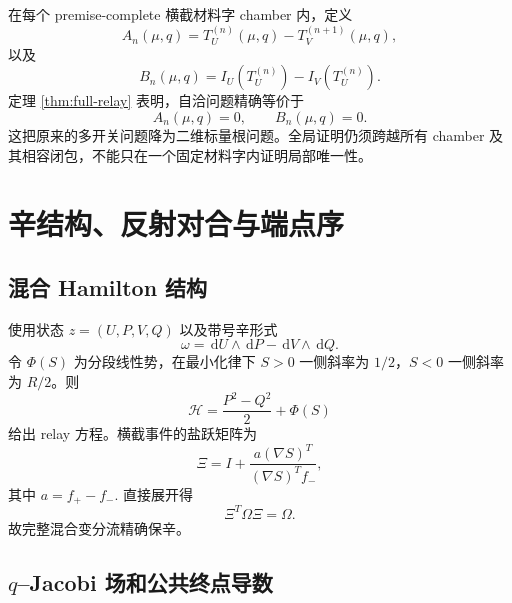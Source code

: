 \documentclass[UTF8,12pt,openany,fontset=fandol]{ctexrep}
\theoremstyle{definition}
\newcommand{\dd}{\,\mathrm d}
\begin{document}
在每个 premise-complete 横截材料字 chamber 内，定义
\begin{equation}
 A_n(\mu,q)=T_U^{(n)}(\mu,q)-T_V^{(n+1)}(\mu,q),
\end{equation}
以及
\begin{equation}
 B_n(\mu,q)=I_U(T_U^{(n)})-I_V(T_U^{(n)}).
\end{equation}
定理 \ref{thm:full-relay} 表明，自洽问题精确等价于
\begin{equation}
 A_n(\mu,q)=0,\qquad B_n(\mu,q)=0.
\end{equation}
这把原来的多开关问题降为二维标量根问题。全局证明仍须跨越所有 chamber 及其相容闭包，不能只在一个固定材料字内证明局部唯一性。

\chapter{辛结构、反射对合与端点序}

\section{混合 Hamilton 结构}

使用状态 $z=(U,P,V,Q)$ 以及带号辛形式
\begin{equation}
 \omega=\dd U\wedge\dd P-\dd V\wedge\dd Q.
\end{equation}
令 $\Phi(S)$ 为分段线性势，在最小化律下 $S>0$ 一侧斜率为 $1/2$，$S<0$ 一侧斜率为 $R/2$。则
\begin{equation}
 \mathcal H=\frac{P^2-Q^2}{2}+\Phi(S)
\end{equation}
给出 relay 方程。横截事件的盐跃矩阵为
\begin{equation}
 \Xi=I+\frac{a(\nabla S)^T}{(\nabla S)^Tf_-},
\end{equation}
其中 $a=f_+-f_-$. 直接展开得
\begin{equation}
 \Xi^T\Omega\Xi=\Omega.
\end{equation}
故完整混合变分流精确保辛。

\section{$q$--Jacobi 场和公共终点导数}
\end{document}

